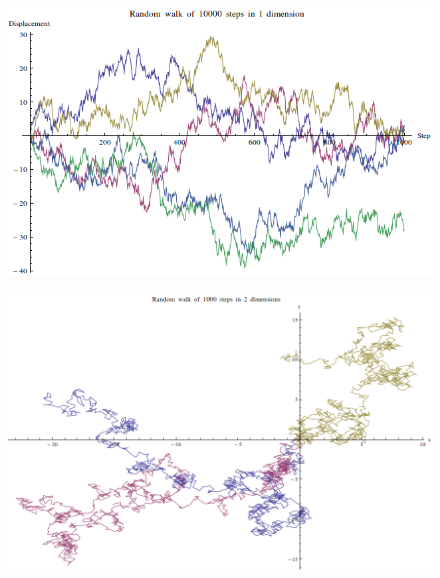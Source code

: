 \documentclass[12pt]{article}
\begin{document}
\begin{figure}[!htb]
\centering
\includegraphics[scale=0.5]{random1}
\end{figure}

\begin{figure}[!htb]
\centering
\includegraphics[scale=0.5]{random2sm}
\end{figure}
\end{document}
